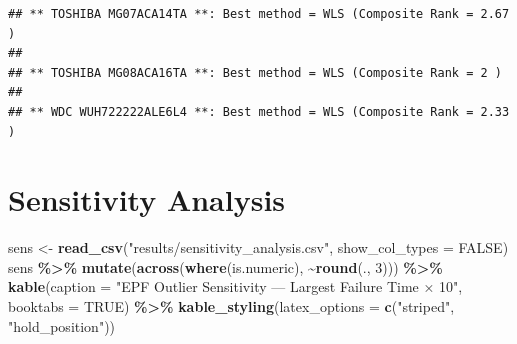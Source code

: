 \documentclass[
]{article}
\newenvironment{Shaded}{\begin{snugshade}}{\end{snugshade}}
\newcommand{\AttributeTok}[1]{\textcolor[rgb]{0.13,0.29,0.53}{#1}}
\newcommand{\ConstantTok}[1]{\textcolor[rgb]{0.56,0.35,0.01}{#1}}
\newcommand{\DecValTok}[1]{\textcolor[rgb]{0.00,0.00,0.81}{#1}}
\newcommand{\FunctionTok}[1]{\textcolor[rgb]{0.13,0.29,0.53}{\textbf{#1}}}
\newcommand{\NormalTok}[1]{#1}
\newcommand{\OtherTok}[1]{\textcolor[rgb]{0.56,0.35,0.01}{#1}}
\newcommand{\SpecialCharTok}[1]{\textcolor[rgb]{0.81,0.36,0.00}{\textbf{#1}}}
\newcommand{\StringTok}[1]{\textcolor[rgb]{0.31,0.60,0.02}{#1}}
\begin{document}
\begin{verbatim}
## ** TOSHIBA MG07ACA14TA **: Best method = WLS (Composite Rank = 2.67 )
## 
## ** TOSHIBA MG08ACA16TA **: Best method = WLS (Composite Rank = 2 )
## 
## ** WDC WUH722222ALE6L4 **: Best method = WLS (Composite Rank = 2.33 )
\end{verbatim}

\section{Sensitivity Analysis}\label{sensitivity-analysis}

\begin{Shaded}
\begin{Highlighting}[]
\NormalTok{sens }\OtherTok{\textless{}{-}} \FunctionTok{read\_csv}\NormalTok{(}\StringTok{"results/sensitivity\_analysis.csv"}\NormalTok{,}
                 \AttributeTok{show\_col\_types =} \ConstantTok{FALSE}\NormalTok{)}
\NormalTok{sens }\SpecialCharTok{\%\textgreater{}\%}
  \FunctionTok{mutate}\NormalTok{(}\FunctionTok{across}\NormalTok{(}\FunctionTok{where}\NormalTok{(is.numeric), }\SpecialCharTok{\textasciitilde{}}\FunctionTok{round}\NormalTok{(., }\DecValTok{3}\NormalTok{))) }\SpecialCharTok{\%\textgreater{}\%}
  \FunctionTok{kable}\NormalTok{(}\AttributeTok{caption =} \StringTok{"EPF Outlier Sensitivity — Largest Failure Time × 10"}\NormalTok{,}
        \AttributeTok{booktabs =} \ConstantTok{TRUE}\NormalTok{) }\SpecialCharTok{\%\textgreater{}\%}
  \FunctionTok{kable\_styling}\NormalTok{(}\AttributeTok{latex\_options =} \FunctionTok{c}\NormalTok{(}\StringTok{"striped"}\NormalTok{, }\StringTok{"hold\_position"}\NormalTok{))}
\end{Highlighting}
\end{Shaded}
\end{document}
